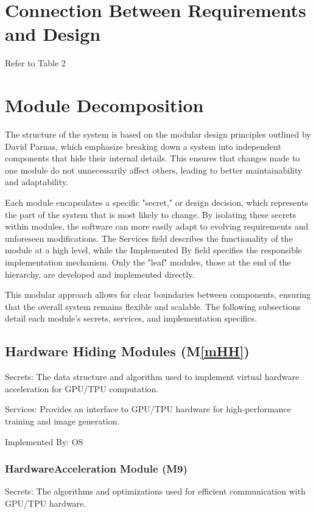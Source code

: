 \documentclass[12pt, titlepage]{article}
\newcommand{\mref}[1]{M\ref{#1}}
\begin{document}
\section{Connection Between Requirements and Design} \label{SecConnection}
Refer to Table 2

\section{Module Decomposition} \label{SecMD}

The structure of the system is based on the modular design principles outlined by David Parnas, which emphasize breaking down a system into independent components that hide their internal details. This ensures that changes made to one module do not unnecessarily affect others, leading to better maintainability and adaptability.

Each module encapsulates a specific "secret," or design decision, which represents the part of the system that is most likely to change. By isolating these secrets within modules, the software can more easily adapt to evolving requirements and unforeseen modifications. The Services field describes the functionality of the module at a high level, while the Implemented By field specifies the responsible implementation mechanism. Only the "leaf" modules, those at the end of the hierarchy, are developed and implemented directly.

This modular approach allows for clear boundaries between components, ensuring that the overall system remains flexible and scalable. The following subsections detail each module's secrets, services, and implementation specifics.

\subsection{Hardware Hiding Modules (\mref{mHH})}

Secrets: The data structure and algorithm used to implement virtual hardware acceleration for GPU/TPU computation.

Services: Provides an interface to GPU/TPU hardware for high-performance training and image generation.

Implemented By: OS



\subsubsection{HardwareAcceleration Module (M9)}
Secrets: The algorithms and optimizations used for efficient communication with GPU/TPU hardware.
\end{document}

